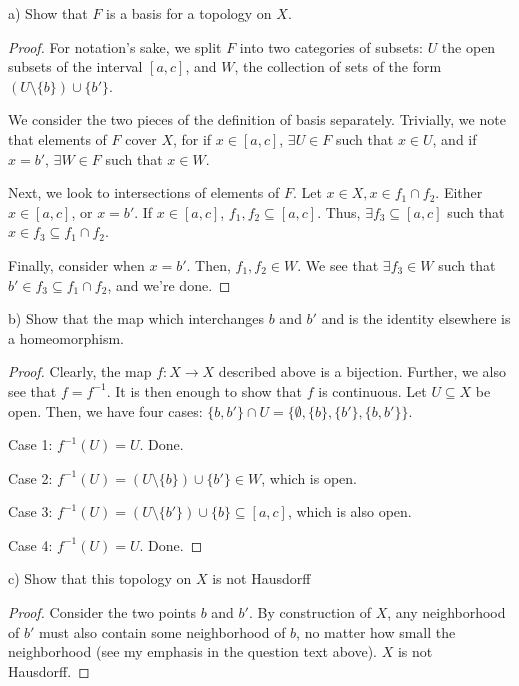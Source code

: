 \documentclass[11pt]{article}
\begin{document}
a) Show that \(F\) is a basis for a topology on \(X\).
\begin{proof}
For notation's sake, we split \(F\) into two categories of subsets: \(U\)
the open subsets of the interval \([a,c]\), and \(W\), the collection of
sets of the form \((U\setminus \{b\})\cup\{b'\}\). 

We consider the two pieces of the definition of basis
separately. Trivially, we note that elements of \(F\) cover \(X\), for if
\(x \in [a,c]\), \(\exists U\in F\) such that \(x \in U\), and if \(x = b'\),
\(\exists W\in F\) such that \(x \in W\).

Next, we look to intersections of elements of \(F\). Let \(x \in X, x \in
f_1\cap f_2\). Either \(x \in [a,c]\), or \(x = b'\). If \(x \in [a,c]\),
\(f_1,f_2 \subseteq [a,c]\). Thus, \(\exists f_3 \subseteq [a,c]\) such
that \(x \in f_3 \subseteq f_1\cap f_2\). 

Finally, consider when \(x = b'\). Then, \(f_1, f_2 \in W\). We see that
\(\exists f_3 \in W\) such that \(b'\in f_3 \subseteq f_1\cap f_2\), and
we're done.
\end{proof}

b) Show that the map which interchanges \(b\) and \(b'\) and is the
   identity elsewhere is a homeomorphism.

\begin{proof}
Clearly, the map \(f:X\rightarrow X\) described above is a
bijection. Further, we also see that \(f = f^{-1}\). It is then enough
to show that \(f\) is continuous. Let \(U\subseteq X\) be open. Then, we
have four cases: \(\{b, b'\}\cap U = \{\emptyset, \{b\}, \{b'\},
\{b,b'\}\}\).

Case 1: \(f^{-1}(U) = U\). Done. 

Case 2: \(f^{-1}(U) = (U\setminus\{b\})\cup\{b'\} \in W\), which is open. 

Case 3: \(f^{-1}(U) = (U\setminus\{b'\})\cup\{b\} \subseteq [a,c]\),
which is also open. 

Case 4: \(f^{-1}(U) = U\). Done. 
\end{proof}

c) Show that this topology on \(X\) is not Hausdorff

\begin{proof}


Consider the two points \(b\) and \(b'\). By construction of \(X\), any
neighborhood of \(b'\) must also contain some neighborhood of \(b\), no
matter how small the neighborhood (see my emphasis in the question
text above). \(X\) is not Hausdorff. 
\end{proof}
\end{document}
